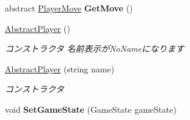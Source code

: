 \begin{DoxyCompactItemize}
\item 
abstract \hyperlink{namespacehoppin_1_1_game_information_afd961b6fde49f79a6a262a67a3683bb7}{Player\+Move} {\bfseries Get\+Move} ()\hypertarget{classhoppin_1_1_game_information_1_1_abstract_player_a497323e57e5b27d893e1a8ab60690373}{}\label{classhoppin_1_1_game_information_1_1_abstract_player_a497323e57e5b27d893e1a8ab60690373}

\item 
\hyperlink{classhoppin_1_1_game_information_1_1_abstract_player_a4e302664d498e2f5b99bda58ec0e6aa6}{Abstract\+Player} ()
\begin{DoxyCompactList}\small\item\em コンストラクタ 名前表示が\+No\+Nameになります \end{DoxyCompactList}\item 
\hyperlink{classhoppin_1_1_game_information_1_1_abstract_player_a4375849e20ccf78ef5b4df436318d042}{Abstract\+Player} (string name)
\begin{DoxyCompactList}\small\item\em コンストラクタ \end{DoxyCompactList}\item 
void {\bfseries Set\+Game\+State} (Game\+State game\+State)\hypertarget{classhoppin_1_1_game_information_1_1_abstract_player_a6e5de7a2c2837dea0fcf87b14a848cc2}{}\label{classhoppin_1_1_game_information_1_1_abstract_player_a6e5de7a2c2837dea0fcf87b14a848cc2}


\end{DoxyCompactItemize}
